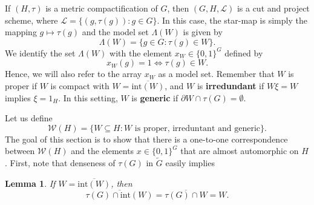 \documentclass[titlepage,reqno,10pt]{amsart}
\newtheorem{lemma}[theorem]{Lemma}
\theoremstyle{definition}
\begin{document}
\medskip

If $(H,\tau)$ is a metric compactification of $G$, then $(G,H, \mathcal{L})$ is a cut and project scheme, where $\mathcal{L}=\{(g,\tau(g)): g\in G\}$. In this case, the star-map is simply the mapping $g\mapsto \tau(g)$ and the model set $\Lambda(W)$ is given by
$$
\Lambda(W)=\{g\in G: \tau(g)\in W\}.
$$
We identify the set $\Lambda(W)$ with the element $x_W\in \{0,1\}^G$ defined by
\begin{equation}\label{eq: def of model set array}
x_W(g)=1 \iff \tau(g)\in W.
\end{equation}
Hence, we will also refer to the array $x_W$ as a model set.
Remember that $W$ is proper if $W$ is compact with $W=\overline{\mathrm{int}(W)}$, and 
 $W$ is {\bf irredundant} if $W\xi = W$ implies $\xi=1_{H}$. In this setting,  $W$ is {\bf generic} if $\partial W \cap \tau(G) = \emptyset$.

Let us define $$\mathcal{W}(H)=\{W\subseteq H: W \mbox{ is proper, irreduntant and generic}\}. $$
The goal of this section is to show that there is a one-to-one correspondence between $\mathcal{W}(H)$ and the elements $x\in\{0,1\}^G$ that are almost automorphic on $H$. First, note that denseness of $\tau(G)$ in $\overleftarrow{G}$ easily implies 

\begin{lemma}\label{interior}
If $W=\overline{\mathrm{int}(W)}$, then 
$$
 \overline{\tau(G)\cap \mathrm{int}(W)}=\overline{\tau(G)\cap W}=W.
$$
\end{lemma}
\end{document}
